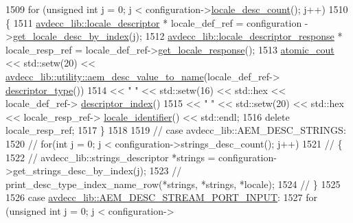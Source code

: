 \begin{DoxyCode}
1509             \textcolor{keywordflow}{for} (\textcolor{keywordtype}{unsigned} \textcolor{keywordtype}{int} j = 0; j < configuration->\hyperlink{classavdecc__lib_1_1configuration__descriptor_ab677ec4987bcd55bfcfa0e524b6f78f6}{locale\_desc\_count}(); j++)
1510             \{
1511                 \hyperlink{classavdecc__lib_1_1locale__descriptor}{avdecc\_lib::locale\_descriptor} * locale\_def\_ref = configuration
      ->\hyperlink{classavdecc__lib_1_1configuration__descriptor_a7d32e35d54b0dfaa2e99318315029269}{get\_locale\_desc\_by\_index}(j);
1512                 \hyperlink{classavdecc__lib_1_1locale__descriptor__response}{avdecc\_lib::locale\_descriptor\_response} * 
      locale\_resp\_ref = locale\_def\_ref->\hyperlink{classavdecc__lib_1_1locale__descriptor_afdc23d6d0ce61b2dcf7b5c9578f26b52}{get\_locale\_response}();
1513                 \hyperlink{cmd__line_8h_a0bc38ccc65c79ba06c6fcd7b4bf554c3}{atomic\_cout} << std::setw(20) << 
      \hyperlink{namespaceavdecc__lib_1_1utility_a6bdd02679e5a911a071d4aa03be341f0}{avdecc\_lib::utility::aem\_desc\_value\_to\_name}(locale\_def\_ref->
      \hyperlink{classavdecc__lib_1_1descriptor__base_a5112b70022171063ec5d3242bee9910e}{descriptor\_type}())
1514                             << \textcolor{stringliteral}{"   "} << std::setw(16) << std::hex << locale\_def\_ref->
      \hyperlink{classavdecc__lib_1_1descriptor__base_a7eed5583bffdf72d89021b188648c1b5}{descriptor\_index}()
1515                             << \textcolor{stringliteral}{"   "} << std::setw(20) << std::hex << locale\_resp\_ref->
      \hyperlink{classavdecc__lib_1_1locale__descriptor__response_a3d76182b9de2bf361ffaa6e7bd80d83c}{locale\_identifier}() << std::endl;
1516                 \textcolor{keyword}{delete} locale\_resp\_ref;
1517             \}
1518 
1519         \textcolor{comment}{//            case avdecc\_lib::AEM\_DESC\_STRINGS:}
1520         \textcolor{comment}{//                for(int j = 0; j < configuration->strings\_desc\_count(); j++)}
1521         \textcolor{comment}{//                \{}
1522         \textcolor{comment}{//                    avdecc\_lib::strings\_descriptor *strings =
       configuration->get\_strings\_desc\_by\_index(j);}
1523         \textcolor{comment}{//                    print\_desc\_type\_index\_name\_row(*strings, *strings, *locale);}
1524         \textcolor{comment}{//                \}}
1525 
1526         \textcolor{keywordflow}{case} \hyperlink{namespaceavdecc__lib_ac7b7d227e46bc72b63ee9e9aae15902fa54a680de439da84c5d5037a246d55b3f}{avdecc\_lib::AEM\_DESC\_STREAM\_PORT\_INPUT}:
1527             \textcolor{keywordflow}{for} (\textcolor{keywordtype}{unsigned} \textcolor{keywordtype}{int} j = 0; j < configuration->

\end{DoxyCode}
